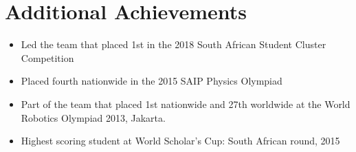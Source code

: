 \documentclass[12pt,a4paper,notitlepage]{article}
\begin{document}
\section*{Additional Achievements}
\begin{itemize}
	\setlength\itemsep{0.02em}
    \item Led the team that placed 1st in the 2018 South African Student Cluster Competition
    \item Placed fourth nationwide in the 2015 SAIP Physics Olympiad
    \item Part of the team that placed 1st nationwide and 27th worldwide at the World Robotics Olympiad 2013, Jakarta.
    \item Highest scoring student at World Scholar's Cup: South African round, 2015
\end{itemize}
\end{document}
